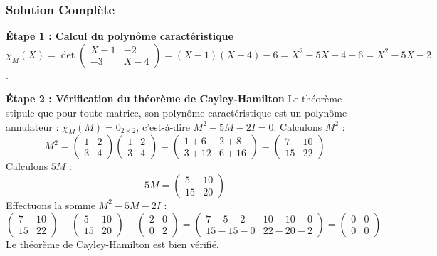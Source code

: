 \documentclass[11pt,a4paper]{article}
\begin{document}
\subsubsection*{Solution Complète}

\textbf{Étape 1 : Calcul du polynôme caractéristique}
$\chi_M(X) = \det\begin{pmatrix} X-1 & -2 \\ -3 & X-4 \end{pmatrix} = (X-1)(X-4) - 6 = X^2 - 5X + 4 - 6 = X^2 - 5X - 2$.

\textbf{Étape 2 : Vérification du théorème de Cayley-Hamilton}
Le théorème stipule que pour toute matrice, son polynôme caractéristique est un polynôme annulateur : $\chi_M(M) = 0_{2\times2}$, c'est-à-dire $M^2 - 5M - 2I = 0$.
Calculons $M^2$ :
$$M^2 = \begin{pmatrix} 1 & 2 \\ 3 & 4 \end{pmatrix} \begin{pmatrix} 1 & 2 \\ 3 & 4 \end{pmatrix} = \begin{pmatrix} 1+6 & 2+8 \\ 3+12 & 6+16 \end{pmatrix} = \begin{pmatrix} 7 & 10 \\ 15 & 22 \end{pmatrix}$$
Calculons $5M$ :
$$5M = \begin{pmatrix} 5 & 10 \\ 15 & 20 \end{pmatrix}$$
Effectuons la somme $M^2 - 5M - 2I$ :
$$\begin{pmatrix} 7 & 10 \\ 15 & 22 \end{pmatrix} - \begin{pmatrix} 5 & 10 \\ 15 & 20 \end{pmatrix} - \begin{pmatrix} 2 & 0 \\ 0 & 2 \end{pmatrix} = \begin{pmatrix} 7-5-2 & 10-10-0 \\ 15-15-0 & 22-20-2 \end{pmatrix} = \begin{pmatrix} 0 & 0 \\ 0 & 0 \end{pmatrix}$$
Le théorème de Cayley-Hamilton est bien vérifié.
\end{document}
